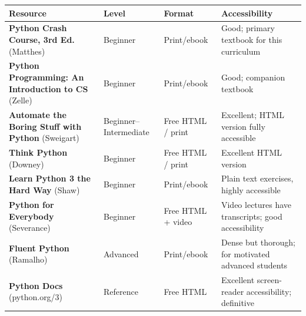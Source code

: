\documentclass[
  justified,
  openright,
]{tufte-book}
\begin{document}
\begin{fullwidth}{\def\LTcaptype{none} %
\begin{longtable}[]{@{}
  >{\raggedright\arraybackslash}p{}
  >{\raggedright\arraybackslash}p{}
  >{\raggedright\arraybackslash}p{}
  >{\raggedright\arraybackslash}p{}@{}}
\toprule\noalign{}
\begin{minipage}[b]{\linewidth}\raggedright
Resource
\end{minipage} & \begin{minipage}[b]{\linewidth}\raggedright
Level
\end{minipage} & \begin{minipage}[b]{\linewidth}\raggedright
Format
\end{minipage} & \begin{minipage}[b]{\linewidth}\raggedright
Accessibility
\end{minipage} \\
\midrule\noalign{}
\endhead
\bottomrule\noalign{}
\endlastfoot
\textbf{Python Crash Course, 3rd Ed.} (Matthes) & Beginner & Print/ebook
& Good; primary textbook for this curriculum \\
\textbf{Python Programming: An Introduction to CS} (Zelle) & Beginner &
Print/ebook & Good; companion textbook \\
\textbf{Automate the Boring Stuff with Python} (Sweigart) &
Beginner--Intermediate & Free HTML / print & Excellent; HTML version
fully accessible \\
\textbf{Think Python} (Downey) & Beginner & Free HTML / print &
Excellent HTML version \\
\textbf{Learn Python 3 the Hard Way} (Shaw) & Beginner & Print/ebook &
Plain text exercises, highly accessible \\
\textbf{Python for Everybody} (Severance) & Beginner & Free HTML + video
& Video lectures have transcripts; good accessibility \\
\textbf{Fluent Python} (Ramalho) & Advanced & Print/ebook & Dense but
thorough; for motivated advanced students \\
\textbf{Python Docs} (python.org/3) & Reference & Free HTML & Excellent
screen-reader accessibility; definitive \\
\end{longtable}
}
\end{fullwidth}
\end{document}

